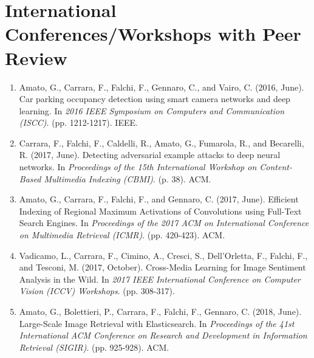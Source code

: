 \section*{International Conferences/Workshops with Peer Review}
\begin{enumerate}
    \item Amato, G., Carrara, F., Falchi, F., Gennaro, C., and Vairo, C. (2016, June). Car parking occupancy detection using smart camera networks and deep learning. In \emph{2016 IEEE Symposium on Computers and Communication (ISCC)}. (pp. 1212-1217). IEEE.
    \item Carrara, F., Falchi, F., Caldelli, R., Amato, G., Fumarola, R., and Becarelli, R. (2017, June). Detecting adversarial example attacks to deep neural networks. In \emph{Proceedings of the 15th International Workshop on Content-Based Multimedia Indexing (CBMI)}. (p. 38). ACM.
    \item Amato, G., Carrara, F., Falchi, F., and Gennaro, C. (2017, June). Efficient Indexing of Regional Maximum Activations of Convolutions using Full-Text Search Engines. In \emph{Proceedings of the 2017 ACM on International Conference on Multimedia Retrieval (ICMR)}. (pp. 420-423). ACM.
    \item Vadicamo, L., Carrara, F., Cimino, A., Cresci, S., Dell’Orletta, F., Falchi, F., and Tesconi, M. (2017, October). Cross-Media Learning for Image Sentiment Analysis in the Wild. In \emph{2017 IEEE International Conference on Computer Vision (ICCV) Workshops}. (pp. 308-317).
    \item Amato, G., Bolettieri, P., Carrara, F., Falchi, F., Gennaro, C. (2018, June). Large-Scale Image Retrieval with Elasticsearch. In \emph{Proceedings of the 41st International ACM Conference on Research and Development in Information Retrieval (SIGIR)}. (pp.  925-928). ACM.
\end{enumerate}


